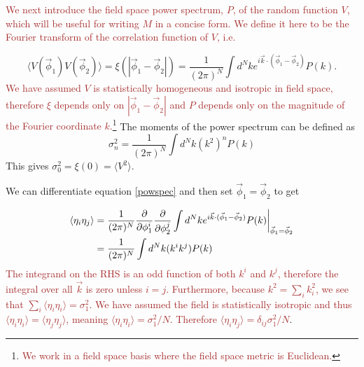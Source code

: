 \documentclass[12pt]{article}
\newcommand{\sh}[1]{\textcolor{brown}{#1}}
\begin{document}
\sh{We next introduce the field space power spectrum, $P$, of the random function $V$, which will be useful for writing $M$ in a concise form. We define it here to be the Fourier transform of the correlation function of $V$, i.e.}

\begin{equation}\label{powspec}
\langle V(\vec{\phi}_1) V(\vec{\phi}_2) \rangle = \xi(|\vec{\phi}_1-\vec{\phi}_2|)= \frac{1}{(2\pi)^N} \int d^Nk e^{i \vec{k} \cdot (\vec{\phi}_1-\vec{\phi}_2)} P(k).
\end{equation}
%
\sh{We have assumed $V$ is statistically homogeneous and isotropic in field space, therefore $\xi$ depends only on $|\vec{\phi}_1-\vec{\phi}_2|$ and  $P$ depends only on the magnitude of the Fourier coordinate $k$.\footnote{\sh{We work in a field space basis where the field space metric is Euclidean.}}} The moments of the power spectrum can be defined as
%
\begin{equation} \label{moments}
\sigma_n^2 = \frac{1}{(2\pi)^N}\int d^Nk (k^{2})^n P(k)
\end{equation}
%
This gives $\sigma_0^2=\xi(0)=\langle V^2 \rangle$.

We can differentiate equation \eqref{powspec} and then set $\vec{\phi}_1 = \vec{\phi}_2$ to get

\begin{align*}
\langle \eta_{i}\eta_{j}\rangle &= \frac{1}{(2\pi)^N} \frac{\partial}{\partial \phi_1^i}\frac{\partial}{\partial \phi_2^j} \int d^Nk e^{i \vec{k} \cdot (\vec{\phi}_1-\vec{\phi}_2)} P(k)\bigg{|}_{\vec{\phi}_1=\vec{\phi}_2}\\
&= \frac{1}{(2\pi)^N}\int d^Nk (k^i k^j) P(k)
\end{align*}
%
\sh{The integrand on the RHS is an odd function of both $k^i$ and $k^j$, therefore the integral over all $\vec{k}$ is zero unless $i=j$. Furthermore, because $k^2 = \sum_i k_i^2$, we see that $\sum_i \langle \eta_{i}\eta_{i}\rangle = \sigma_1^2$. We have assumed the field is statistically isotropic and thus $\langle \eta_{i}\eta_{i}\rangle=\langle \eta_{j}\eta_{j}\rangle$, meaning $\langle \eta_{i}\eta_{i}\rangle=\sigma_1^2/N$. Therefore $\langle \eta_{i}\eta_{j}\rangle=\delta_{ij}\sigma_1^2/N$}.

\end{document}
